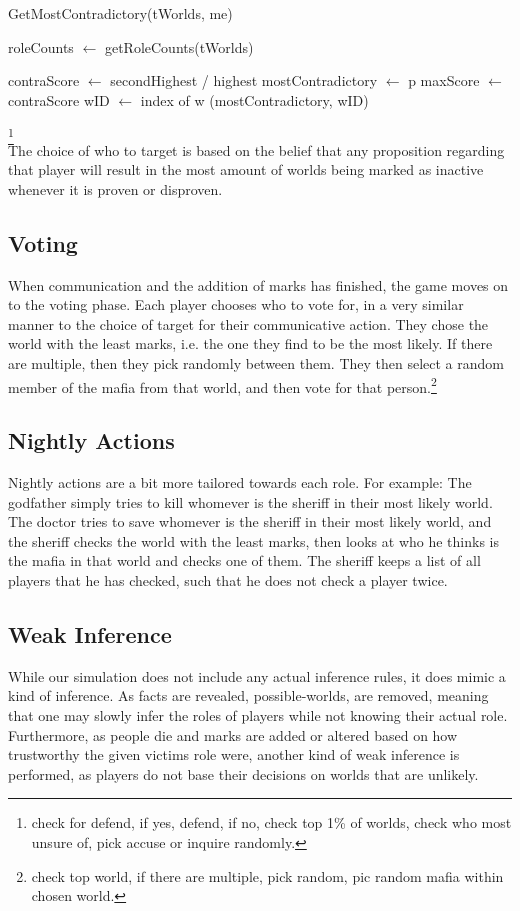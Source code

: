 \begin{algorithm}[H]
	\caption{GetMostContradictory(tWorlds, me)}
	\begin{algorithmic}
		\State roleCounts $\gets$ getRoleCounts(tWorlds)

		\State contraScore $\gets$ secondHighest / highest
		\State mostContradictory $\gets$ p
		\State maxScore $\gets$ contraScore
		\State wID $\gets$ index of w
		\EndIf
		\EndFor
		\EndFor
		\State \Return (mostContradictory, wID)
	\end{algorithmic}
\end{algorithm}
\footnote[1]{check for
	defend, if yes, defend, if no, check top 1\% of worlds, check who most unsure
	of, pick accuse or inquire randomly.}\\ The choice of who to target is based on
the belief that any proposition regarding that player will result in the most
amount of worlds being marked as inactive whenever it is proven or disproven.
\subsection{Voting}\label{Voting}
When communication and the addition of marks has finished, the game moves on to
the voting phase. Each player chooses who to vote for, in a very similar manner
to the choice of target for their communicative action. They chose the world
with the least marks, i.e. the one they find to be the most likely. If there
are multiple, then they pick randomly between them. They then select a random
member of the mafia from that world, and then vote for that
person.\footnote[2]{ check top world, if there are multiple, pick random, pic
	random mafia within chosen world.} 
\subsection{Nightly Actions}\label{NightlyActions}
Nightly actions are a bit more tailored towards each role. For example: The
godfather simply tries to kill whomever is the sheriff in their most likely
world. The doctor tries to save whomever is the sheriff in their most likely
world, and the sheriff checks the world with the least marks, then looks at who
he thinks is the mafia in that world and checks one of them. The sheriff keeps
a list of all players that he has checked, such that he does not check a player
twice.
\subsection{Weak Inference}\label{WeakInference}
While our simulation does not include any actual inference rules, it does mimic
a kind of inference. As facts are revealed, possible-worlds, are removed,
meaning that one may slowly infer the roles of players while not knowing their
actual role. Furthermore, as people die and marks are added or altered based on
how trustworthy the given victims role were, another kind of weak inference is
performed, as players do not base their decisions on worlds that are unlikely.
